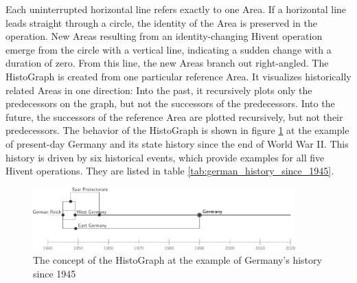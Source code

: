 \vspace{-2.5em}

Each uninterrupted horizontal line refers exactly to one Area. If a horizontal line leads straight through a circle, the identity of the Area is preserved in the operation. New Areas resulting from an identity-changing Hivent operation emerge from the circle with a vertical line, indicating a sudden change with a duration of zero. From this line, the new Areas branch out right-angled. The HistoGraph is created from one particular reference Area. It visualizes historically related Areas in one direction: Into the past, it recursively plots only the predecessors on the graph, but not the successors of the predecessors. Into the future, the successors of the reference Area are plotted recursively, but not their predecessors.
The behavior of the HistoGraph is shown in figure \ref{fig:example_germany} at the example of present-day Germany and its state history since the end of World War II. This history is driven by six historical events, which provide examples for all five Hivent operations. They are listed in table \ref{tab:german_history_since_1945}.

\begin{figure}[ht]
  \vspace{0.5em}
  \centering
  \includegraphics[width=0.9\textwidth]{graphics/development/hivent_model/histograph/example_germany}
  \caption{The concept of the HistoGraph at the example of Germany's history since 1945}
  \label{fig:example_germany}
\end{figure}


